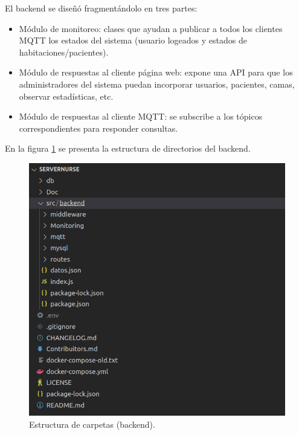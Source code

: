 El backend se diseñó fragmentándolo en tres partes:

\begin{itemize}
\item Módulo de monitoreo: clases que ayudan a publicar a todos los clientes MQTT los estados del sistema (usuario logeados y estados de habitaciones/pacientes). 
\item Módulo de respuestas al cliente página web: expone una API para que los administradores del sistema puedan incorporar usuarios, pacientes, camas, observar estadísticas, etc.
\item Módulo de respuestas al cliente MQTT: se subscribe a los tópicos correspondientes para responder consultas.
\end{itemize}

En la figura \ref{fig:Estructura de carpetas (backend)} se presenta la estructura de directorios del backend.

\begin{figure}[ht]
	\centering
	\includegraphics[scale=.45]{./Figures/projectStructure.png}
	\caption{Estructura de carpetas (backend).}
	\label{fig:Estructura de carpetas (backend)}
\end{figure}

